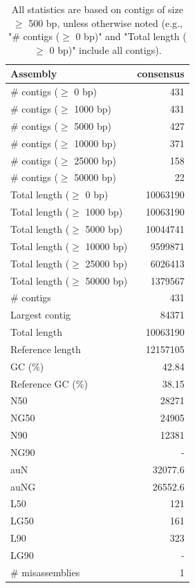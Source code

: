 \documentclass[12pt,a4paper]{article}
\begin{document}
\begin{table}[ht]
\begin{center}
\caption{All statistics are based on contigs of size $\geq$ 500 bp, unless otherwise noted (e.g., "\# contigs ($\geq$ 0 bp)" and "Total length ($\geq$ 0 bp)" include all contigs).}
\begin{tabular}{|l*{1}{|r}|}
\hline
Assembly & consensus \\ \hline
\# contigs ($\geq$ 0 bp) & 431 \\ \hline
\# contigs ($\geq$ 1000 bp) & 431 \\ \hline
\# contigs ($\geq$ 5000 bp) & 427 \\ \hline
\# contigs ($\geq$ 10000 bp) & 371 \\ \hline
\# contigs ($\geq$ 25000 bp) & 158 \\ \hline
\# contigs ($\geq$ 50000 bp) & 22 \\ \hline
Total length ($\geq$ 0 bp) & 10063190 \\ \hline
Total length ($\geq$ 1000 bp) & 10063190 \\ \hline
Total length ($\geq$ 5000 bp) & 10044741 \\ \hline
Total length ($\geq$ 10000 bp) & 9599871 \\ \hline
Total length ($\geq$ 25000 bp) & 6026413 \\ \hline
Total length ($\geq$ 50000 bp) & 1379567 \\ \hline
\# contigs & 431 \\ \hline
Largest contig & 84371 \\ \hline
Total length & 10063190 \\ \hline
Reference length & 12157105 \\ \hline
GC (\%) & 42.84 \\ \hline
Reference GC (\%) & 38.15 \\ \hline
N50 & 28271 \\ \hline
NG50 & 24905 \\ \hline
N90 & 12381 \\ \hline
NG90 & - \\ \hline
auN & 32077.6 \\ \hline
auNG & 26552.6 \\ \hline
L50 & 121 \\ \hline
LG50 & 161 \\ \hline
L90 & 323 \\ \hline
LG90 & - \\ \hline
\# misassemblies & 1 \\ \hline

\end{tabular}
\end{center}
\end{table}
\end{document}
